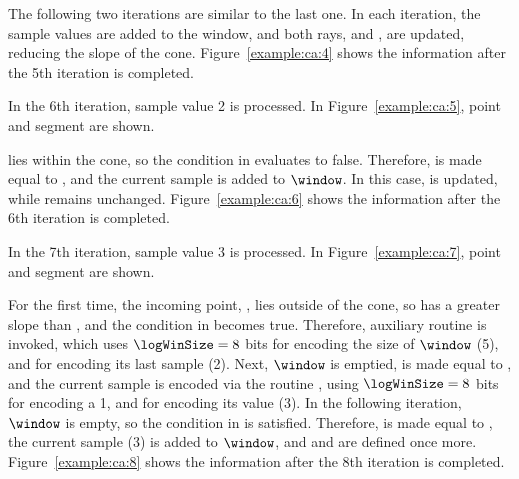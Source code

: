 

The following two iterations are similar to the last one. In each iteration, the sample values are added to the window, and both rays, \smin and \smax, are updated, reducing the slope of the cone. Figure~\ref{example:ca:4} shows the information after the 5th iteration is completed.



\clearpage


In the 6th iteration, sample value 2 is processed. In Figure~\ref{example:ca:5}, point  and segment  are shown.




 lies within the cone, so the condition in  evaluates to false. Therefore, \snapshot is made equal to , and the current sample is added to $\window$. In this case, \smin is updated, while \smax remains unchanged. Figure~\ref{example:ca:6} shows the information after the 6th iteration is completed.




\clearpage

In the 7th iteration, sample value 3 is processed. In Figure~\ref{example:ca:7}, point  and segment  are shown.




For the first time, the incoming point, , lies outside of the cone, so  has a greater slope than \smax, and the condition in  becomes true. Therefore, auxiliary routine \CAWinEnd is invoked, which uses $\logWinSize = 8$ bits for encoding the size of $\window$ (5), and \tobitexp for encoding its last sample (2). Next, $\window$ is emptied, \archived is made equal to , and the current sample is encoded via the routine \CAWinStart, using $\logWinSize =8$ bits for encoding a 1, and \tobitexp for encoding its value (3). In the following iteration, $\window$ is empty, so the condition in  is satisfied. Therefore, \snapshot is made equal to , the current sample (3) is added to $\window$, and \smin and \smax are defined once more. Figure~\ref{example:ca:8} shows the information after the 8th iteration is completed.



